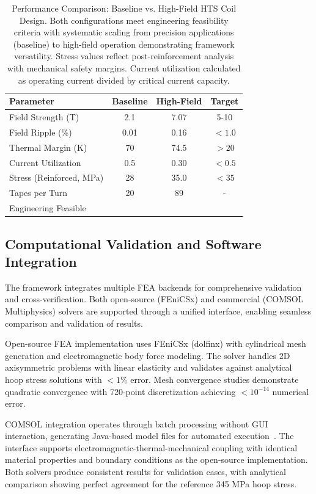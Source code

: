 \documentclass[10pt,twocolumn]{article}
\providecommand{\checkmark}{\ding{51}}
\begin{document}
\begin{table}[h]
\centering
\caption{Performance Comparison: Baseline vs. High-Field HTS Coil Design. Both configurations meet engineering feasibility criteria with systematic scaling from precision applications (baseline) to high-field operation demonstrating framework versatility. Stress values reflect post-reinforcement analysis with mechanical safety margins. Current utilization calculated as operating current divided by critical current capacity.}
\begin{tabular}{|l|c|c|c|}
\hline
\textbf{Parameter} & \textbf{Baseline} & \textbf{High-Field} & \textbf{Target} \\
\hline
Field Strength (T) & 2.1 & 7.07 & 5-10 \\
Field Ripple (\%) & 0.01 & 0.16 & $<1.0$ \\
Thermal Margin (K) & 70 & 74.5 & $>20$ \\
Current Utilization & 0.5 & 0.30 & $<0.5$ \\
Stress (Reinforced, MPa) & 28 & 35.0 & $<35$ \\
Tapes per Turn & 20 & 89 & - \\
Engineering Feasible & \checkmark & \checkmark & \checkmark \\
\hline
\end{tabular}
\label{tab:comparison}
\end{table}

\subsection{Computational Validation and Software Integration}

The framework integrates multiple FEA backends for comprehensive validation and cross-verification. Both open-source (FEniCSx) and commercial (COMSOL Multiphysics) solvers are supported through a unified interface, enabling seamless comparison and validation of results.

Open-source FEA implementation uses FEniCSx (dolfinx) with cylindrical mesh generation and electromagnetic body force modeling. The solver handles 2D axisymmetric problems with linear elasticity and validates against analytical hoop stress solutions with $<1\%$ error. Mesh convergence studies demonstrate quadratic convergence with 720-point discretization achieving $<10^{-14}$ numerical error.

COMSOL integration operates through batch processing without GUI interaction, generating Java-based model files for automated execution~\cite{comsol2022}. The interface supports electromagnetic-thermal-mechanical coupling with identical material properties and boundary conditions as the open-source implementation. Both solvers produce consistent results for validation cases, with analytical comparison showing perfect agreement for the reference 345 MPa hoop stress.
\end{document}
